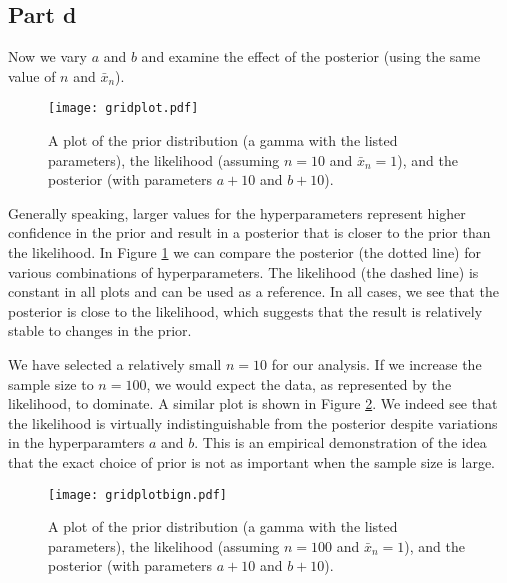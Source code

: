 \documentclass[a4paper,10pt]{article}
\begin{document}
\subsection{Part d}
Now we vary $a$ and $b$ and examine the effect of the posterior (using the same value of $n$ and $\bar{x}_{n}$).    
\begin{figure}
\centering
\texttt{[image: gridplot.pdf]}
\caption{\label{gridplot} A plot of the prior distribution (a gamma with the listed parameters), the likelihood (assuming $n=10$ and $\bar{x}_{n}=1$), and the posterior (with parameters $a + 10$ and $b+10$).}
\end{figure}
Generally speaking, larger values for the hyperparameters represent higher confidence in the prior and result in a posterior that is closer to the prior than the likelihood.  In Figure \ref{gridplot} we can compare the posterior (the dotted line) for various combinations of hyperparameters.  The likelihood (the dashed line) is constant in all plots and can be used as a reference.  In all cases, we see that the posterior is close to the likelihood, which suggests that the result is relatively stable to changes in the prior.  

We have selected a relatively small $n=10$ for our analysis.  If we increase the sample size to $n=100$, we would expect the data, as represented by the likelihood, to dominate.  A similar plot is shown in Figure \ref{gridplotbign}.  We indeed see that the likelihood is virtually indistinguishable from the posterior despite variations in the hyperparamters $a$ and $b$.  This is an empirical demonstration of the idea that the exact choice of prior is not as important when the sample size is large.
\begin{figure}
\centering
\texttt{[image: gridplotbign.pdf]}
\caption{\label{gridplotbign} A plot of the prior distribution (a gamma with the listed parameters), the likelihood (assuming $n=100$ and $\bar{x}_{n}=1$), and the posterior (with parameters $a + 10$ and $b+10$).}
\end{figure}
\end{document}
